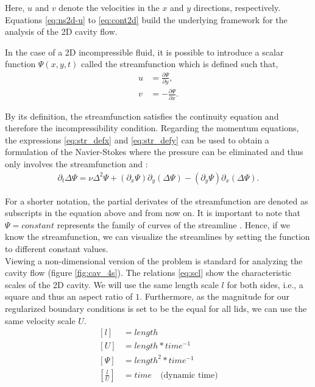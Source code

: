 Here, $u$ and $v$ denote the velocities in the $x$ and $y$ directions,
respectively. Equations \eqref{eq:ns2d-u} to \eqref{eq:cont2d} build the
underlying framework for the analysis of the 2D cavity flow.

\clearpage

In the case of a 2D incompressible fluid, it is possible to introduce a scalar
function $\Psi(x,y,t)$ called the streamfunction which is defined such that,
\begin{align}
u & = \frac{\partial \Psi}{\partial y}, \label{eq:str_defx} \\
v & = -\frac{\partial \Psi}{\partial x}. \label{eq:str_defy} 
\end{align}

By its definition, the streamfunction satisfies the continuity equation and
therefore the incompressibility condition. Regarding the momentum equations,
the expressions \eqref{eq:str_defx} and \eqref{eq:str_defy} can be used to
obtain a formulation of the Navier-Stokes where the pressure can be eliminated
and thus only involves the streamfunction and \citep{landau1987}:
\begin{align}
\partial_t \Delta \Psi = \nu \Delta^2 \Psi
  + (\partial_x \Psi) \partial_y(\Delta \Psi)
  - (\partial_y \Psi) \partial_x(\Delta \Psi). \label{eq:str_dim}
\end{align}

For a shorter notation, the partial derivates of the streamfunction are denoted
as subscripts in the equation above and from now on. It is important to note
that $\Psi = constant$ represents the family of curves of the streamline
\citep{landau1987}. Hence, if we know the streamfunction, we can visualize the
streamlines by setting the function to different constant values. \\

Viewing a non-dimensional version of the problem is standard for analyzing the
cavity flow (figure \ref{fig:cav_4s}). The relations \eqref{eq:scl} show the
characteristic scales of the 2D cavity. We will use the same length scale $l$
for both sides, i.e., a square and thus an aspect ratio of $1$. Furthermore, as
the magnitude for our regularized boundary conditions is set to be the equal
for all lids, we can use the same velocity scale $U$.
\vspace{-5pt}
\begin{equation}
\begin{split}
\left[ l \right] &= length  \\
\left[ U \right] &= length*time^{-1} \\
\left[ \Psi \right] &= length^2*time^{-1} \\
\left[ \frac{l}{U} \right] &= time \quad \text{(dynamic time)} \\
\end{split}
\label{eq:scl}
\end{equation}

